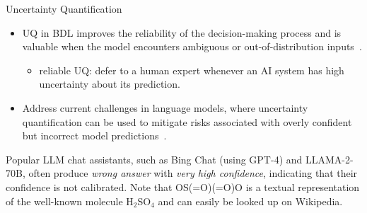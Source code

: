 \documentclass[9pt]{beamer}
\begin{document}
\begin{frame}{Uncertainty Quantification}
\begin{itemize}[<+->]
	\item UQ in BDL improves the reliability of the decision-making process and is valuable when the model encounters ambiguous or \alert{out-of-distribution inputs}~\citep{tran2022plex}.
	\begin{itemize}
		\item \alert{reliable UQ}: defer to a human expert whenever an AI system has high uncertainty about its prediction.
	\end{itemize}
	\item Address current challenges in \alert{language models}, where uncertainty quantification can be used to mitigate risks associated with overly confident but incorrect model predictions~\citep{kadavath2022language}.
\end{itemize}
\pause

\begin{center}
\end{center}
Popular LLM chat assistants, such as Bing Chat (using GPT-4) and LLAMA-2-70B, often produce \emph{wrong answer} with \emph{very high confidence}, indicating that their confidence is not calibrated.
      Note that OS(=O)(=O)O is a textual representation of the well-known molecule H\(_2\)SO\(_4\) and can easily be looked up on Wikipedia.
\end{frame}
\end{document}

